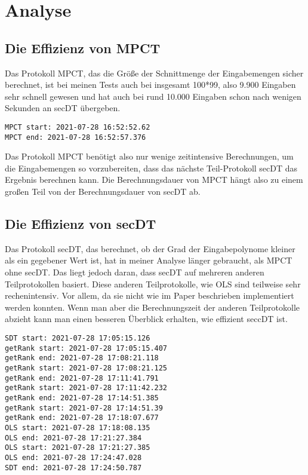 \chapter{Analyse}


\section{Die Effizienz von MPCT}
Das Protokoll MPCT, das die Größe der Schnittmenge der Eingabemengen sicher berechnet, ist bei meinen Tests auch bei insgesamt 100*99, also 9.900 Eingaben sehr schnell gewesen und hat auch bei rund 10.000 Eingaben schon nach wenigen Sekunden an secDT übergeben.\\
\begin{lstlisting}[caption = Ausschnitt von Rückgabe von Test MPCTTestBig. Dauer von MPCT ohne SDT]
MPCT start: 2021-07-28 16:52:52.62
MPCT end: 2021-07-28 16:52:57.376
\end{lstlisting}
Das Protokoll MPCT benötigt also nur wenige zeitintensive Berechnungen, um die Eingabemengen so vorzubereiten, dass das nächste Teil-Protokoll secDT das Ergebnis berechnen kann. Die Berechnungsdauer von MPCT hängt also zu einem großen Teil von der Berechnungsdauer von secDT ab. 

\section{Die Effizienz von secDT}
Das Protokoll secDT, das berechnet, ob der Grad der Eingabepolynome kleiner als ein gegebener Wert ist, hat in meiner Analyse länger gebraucht, als MPCT ohne secDT. Das liegt jedoch daran, dass secDT auf mehreren anderen Teilprotokollen basiert. Diese anderen Teilprotokolle, wie OLS sind teilweise sehr rechenintensiv. Vor allem, da sie nicht wie im Paper beschrieben implementiert werden konnten. Wenn man aber die Berechnungszeit der anderen Teilprotokolle abzieht kann man einen besseren Überblick erhalten, wie effizient seccDT ist.

\begin{lstlisting}[caption = Ausschnitt von Rückgabe von Test MPCTTestBig. Dauer von SDT]
SDT start: 2021-07-28 17:05:15.126
getRank start: 2021-07-28 17:05:15.407
getRank end: 2021-07-28 17:08:21.118
getRank start: 2021-07-28 17:08:21.125
getRank end: 2021-07-28 17:11:41.791
getRank start: 2021-07-28 17:11:42.232
getRank end: 2021-07-28 17:14:51.385
getRank start: 2021-07-28 17:14:51.39
getRank end: 2021-07-28 17:18:07.677
OLS start: 2021-07-28 17:18:08.135
OLS end: 2021-07-28 17:21:27.384
OLS start: 2021-07-28 17:21:27.385
OLS end: 2021-07-28 17:24:47.028
SDT end: 2021-07-28 17:24:50.787
\end{lstlisting}

